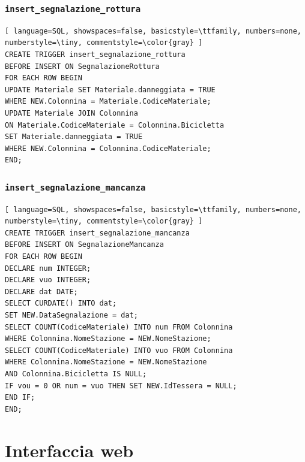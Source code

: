 \documentclass[a4paper,twoside]{article}
\begin{document}
\subsubsection{\texttt{insert\_segnalazione\_rottura}}
\begin{lstlisting}[ language=SQL, showspaces=false, basicstyle=\ttfamily, numbers=none, numberstyle=\tiny, commentstyle=\color{gray} ]
CREATE TRIGGER insert_segnalazione_rottura
BEFORE INSERT ON SegnalazioneRottura
FOR EACH ROW BEGIN
UPDATE Materiale SET Materiale.danneggiata = TRUE
WHERE NEW.Colonnina = Materiale.CodiceMateriale;
UPDATE Materiale JOIN Colonnina
ON Materiale.CodiceMateriale = Colonnina.Bicicletta
SET Materiale.danneggiata = TRUE
WHERE NEW.Colonnina = Colonnina.CodiceMateriale;
END;
\end{lstlisting}
\subsubsection{\texttt{insert\_segnalazione\_mancanza}}
\begin{lstlisting}[ language=SQL, showspaces=false, basicstyle=\ttfamily, numbers=none, numberstyle=\tiny, commentstyle=\color{gray} ]
CREATE TRIGGER insert_segnalazione_mancanza
BEFORE INSERT ON SegnalazioneMancanza
FOR EACH ROW BEGIN
DECLARE num INTEGER;
DECLARE vuo INTEGER;
DECLARE dat DATE;
SELECT CURDATE() INTO dat;
SET NEW.DataSegnalazione = dat;
SELECT COUNT(CodiceMateriale) INTO num FROM Colonnina
WHERE Colonnina.NomeStazione = NEW.NomeStazione;
SELECT COUNT(CodiceMateriale) INTO vuo FROM Colonnina
WHERE Colonnina.NomeStazione = NEW.NomeStazione
AND Colonnina.Bicicletta IS NULL;
IF vou = 0 OR num = vuo THEN SET NEW.IdTessera = NULL;
END IF;
END;
\end{lstlisting}

\section{Interfaccia web}
\end{document}
